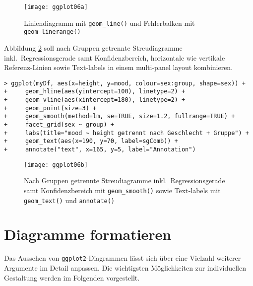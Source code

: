\begin{figure}[ht]
\centering
\texttt{[image: ggplot06a]}
\vspace*{-0.5em}
\caption{Liniendiagramm mit \lstinline!geom_line()! und Fehlerbalken mit \lstinline!geom_linerange()!}
\label{fig:ggplot6a}
\end{figure}

Abbildung \ref{fig:ggplot06b} soll nach Gruppen getrennte Streudiagramme inkl.\ Regressionsgerade samt Konfidenzbereich, horizontale wie vertikale Referenz-Linien sowie Text-labels in einem multi-panel layout kombinieren.
\begin{lstlisting}
> ggplot(myDf, aes(x=height, y=mood, colour=sex:group, shape=sex)) +
+     geom_hline(aes(yintercept=100), linetype=2) +
+     geom_vline(aes(xintercept=180), linetype=2) +
+     geom_point(size=3) +
+     geom_smooth(method=lm, se=TRUE, size=1.2, fullrange=TRUE) +
+     facet_grid(sex ~ group) +
+     labs(title="mood ~ height getrennt nach Geschlecht + Gruppe") +
+     geom_text(aes(x=190, y=70, label=sgComb)) +
+     annotate("text", x=165, y=5, label="Annotation")
\end{lstlisting}

\begin{figure}[ht]
\centering
\texttt{[image: ggplot06b]}
\vspace*{-0.5em}
\caption{Nach Gruppen getrennte Streudiagramme inkl.\ Regressionsgerade samt Konfidenzbereich mit \lstinline!geom_smooth()! sowie Text-labels mit \lstinline!geom_text()! und \lstinline!annotate()!}
\label{fig:ggplot06b}
\end{figure}

\section{Diagramme formatieren}
\label{sec:ggplotFormat}

Das Aussehen von \lstinline!ggplot2!-Diagrammen lässt sich über eine Vielzahl weiterer Argumente im Detail anpassen. Die wichtigsten Möglichkeiten zur individuellen Gestaltung werden im Folgenden vorgestellt.

